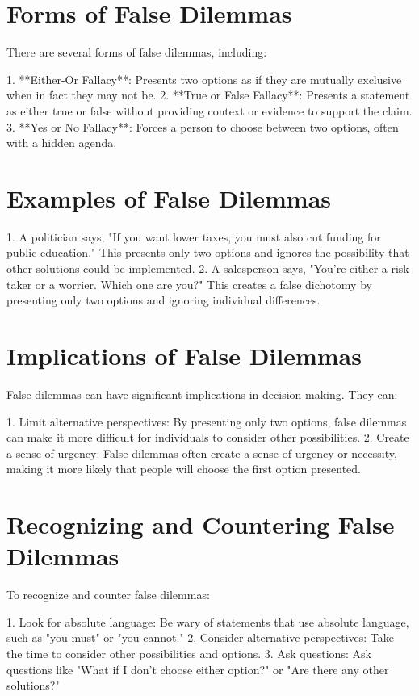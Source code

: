 \documentclass{report}%
\begin{document}
{{{\section{Forms of False Dilemmas}

There are several forms of false dilemmas, including:

1. **Either-Or Fallacy**: Presents two options as if they are mutually exclusive when in fact they may not be.
2. **True or False Fallacy**: Presents a statement as either true or false without providing context or evidence to support the claim.
3. **Yes or No Fallacy**: Forces a person to choose between two options, often with a hidden agenda.

\section{Examples of False Dilemmas}

1. A politician says, "If you want lower taxes, you must also cut funding for public education." This presents only two options and ignores the possibility that other solutions could be implemented.
2. A salesperson says, "You're either a risk-taker or a worrier. Which one are you?" This creates a false dichotomy by presenting only two options and ignoring individual differences.

\section{Implications of False Dilemmas}

False dilemmas can have significant implications in decision-making. They can:

1. Limit alternative perspectives: By presenting only two options, false dilemmas can make it more difficult for individuals to consider other possibilities.
2. Create a sense of urgency: False dilemmas often create a sense of urgency or necessity, making it more likely that people will choose the first option presented.

\section{Recognizing and Countering False Dilemmas}

To recognize and counter false dilemmas:

1. Look for absolute language: Be wary of statements that use absolute language, such as "you must" or "you cannot."
2. Consider alternative perspectives: Take the time to consider other possibilities and options.
3. Ask questions: Ask questions like "What if I don't choose either option?" or "Are there any other solutions?"

}}}
\end{document}

